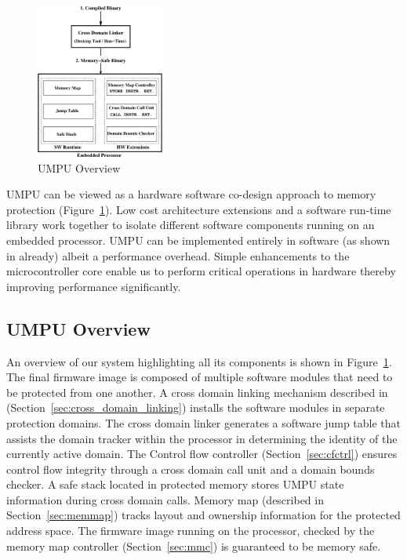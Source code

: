 \begin{figure}[htbp]
   \centering
   \includegraphics[height = 2.0in,
   keepaspectratio=true]{figures/umpuoverview.eps} 
   \caption{UMPU Overview}
   \label{fig:umpuoverview}
\end{figure}
%
UMPU can be viewed as a hardware software co-design approach to memory
protection (Figure~\ref{fig:umpuoverview}).
%
Low cost architecture extensions and a software run-time library work
together to isolate different software components running on an
embedded processor.
%
UMPU can be implemented entirely in software (as shown in already)
albeit a performance overhead.
%
Simple enhancements to the microcontroller core enable us to perform
critical operations in hardware thereby improving performance
significantly.
%
\subsection{UMPU Overview}
%
An overview of our system highlighting all its components is shown in
Figure~\ref{fig:umpuoverview}.
%
The final firmware image is composed of multiple software modules that
need to be protected from one another.
%
%
A cross domain linking mechanism described in
(Section~\ref{sec:cross_domain_linking}) installs the software modules
in separate protection domains.
%
The cross domain linker generates a software jump table that assists
the domain tracker within the processor in determining the identity of 
the currently active domain.
%
The Control flow controller (Section~\ref{sec:cfctrl}) ensures control flow integrity through a cross domain call unit and a domain bounds checker.
%
A safe stack located in protected memory stores UMPU state information during cross domain calls.
%
Memory map (described in Section~\ref{sec:memmap}) tracks layout and ownership information for the protected address space.
%
The firmware image running on the processor, checked by the  memory map controller (Section~\ref{sec:mmc}) is guaranteed to be memory safe.
%
%

